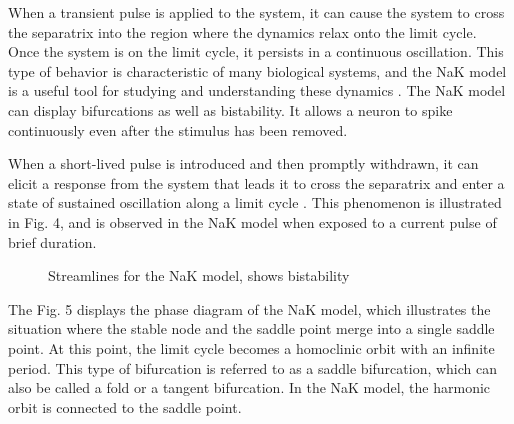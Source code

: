 \documentclass[12pt,a4paper]{report}
\begin{document}
When a transient pulse is applied to the system, it can cause the system to cross the separatrix into the region where the dynamics relax onto the limit cycle. Once the system is on the limit cycle, it persists in a continuous oscillation. This type of behavior is characteristic of many biological systems, and the NaK model is a useful tool for studying and understanding these dynamics \cite{ref9}. The NaK model can display bifurcations as well as bistability. It allows a neuron to spike continuously even after the stimulus has been removed. 

When a short-lived pulse is introduced and then promptly withdrawn, it can elicit a response from the system that leads it to cross the separatrix and enter a state of sustained oscillation along a limit cycle \cite{ref10}. This phenomenon is illustrated in Fig. 4, and is observed in the NaK model when exposed to a current pulse of brief duration.


\begin{figure}[H]
    \centering %
\caption{Streamlines for the NaK model, shows bistability\cite{ref9}} 
\end{figure}
    
    
The Fig. 5 displays the phase diagram of the NaK model, which illustrates the situation where the stable node and the saddle point merge into a single saddle point. At this point, the limit cycle becomes a homoclinic orbit with an infinite period. This type of bifurcation is referred to as a saddle bifurcation, which can also be called a fold or a tangent bifurcation. In the NaK model, the harmonic orbit is connected to the saddle point.
    
\end{document}

